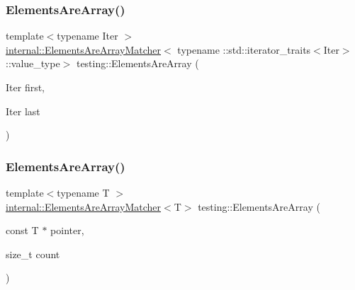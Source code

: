 \mbox{\label{namespacetesting_ae2eee06e7ddbf5f5372fd24372e9703f}} 
\subsubsection{\texorpdfstring{Elements\+Are\+Array()}{ElementsAreArray()}\hspace{0.1cm}{\footnotesize\ttfamily [1/4]}}
{\footnotesize\ttfamily template$<$typename Iter $>$ \\
\hyperlink{classtesting_1_1internal_1_1_elements_are_array_matcher}{internal\+::\+Elements\+Are\+Array\+Matcher}$<$ typename \+::std\+::iterator\+\_\+traits$<$Iter$>$\+::value\+\_\+type$>$ testing\+::\+Elements\+Are\+Array (\begin{DoxyParamCaption}\item[{Iter}]{first,  }\item[{Iter}]{last }\end{DoxyParamCaption})\hspace{0.3cm}{\ttfamily [inline]}}

\mbox{\label{namespacetesting_abf5c2219b4e6a7542368b5f68eadd007}} 
\subsubsection{\texorpdfstring{Elements\+Are\+Array()}{ElementsAreArray()}\hspace{0.1cm}{\footnotesize\ttfamily [2/4]}}
{\footnotesize\ttfamily template$<$typename T $>$ \\
\hyperlink{classtesting_1_1internal_1_1_elements_are_array_matcher}{internal\+::\+Elements\+Are\+Array\+Matcher}$<$T$>$ testing\+::\+Elements\+Are\+Array (\begin{DoxyParamCaption}\item[{const T $\ast$}]{pointer,  }\item[{size\+\_\+t}]{count }\end{DoxyParamCaption})\hspace{0.3cm}{\ttfamily [inline]}}

\mbox{\label{namespacetesting_ac5895c9867d6b976351446a043dcdd66}} 
